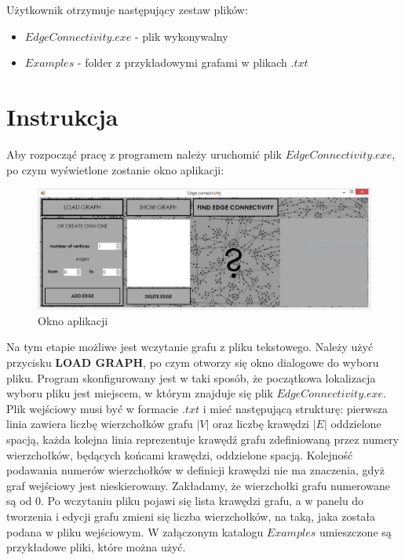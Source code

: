 \documentclass{article}
\begin{document}
Użytkownik otrzymuje następujący zestaw plików:

\begin{itemize}
    \item $EdgeConnectivity.exe$ - plik wykonywalny
    \item $Examples$ - folder z przykładowymi grafami w plikach $.txt$
\end{itemize}



\section{Instrukcja}

Aby rozpocząć pracę z programem należy uruchomić plik $EdgeConnectivity.exe$, po czym wyświetlone zostanie okno aplikacji:
 
\begin{figure}[H]
\centering
\includegraphics[scale=0.4]{01}
\caption{Okno aplikacji}
\end{figure}


Na tym etapie możliwe jest wczytanie grafu z pliku tekstowego. Należy użyć przycisku \textbf{LOAD GRAPH}, po czym otworzy się okno dialogowe do wyboru pliku. Program skonfigurowany jest w taki sposób, że początkowa lokalizacja wyboru pliku jest miejscem, w którym znajduje się plik $EdgeConnectivity.exe$. Plik wejściowy musi być w formacie $.txt$ i mieć następującą strukturę:  pierwsza linia zawiera liczbę wierzchołków grafu $|V|$ oraz liczbę krawędzi $|E|$ oddzielone spacją, każda kolejna linia reprezentuje krawędź grafu zdeﬁniowaną przez numery wierzchołków, będących końcami krawędzi, oddzielone spacją. Kolejność podawania numerów wierzchołków w deﬁnicji krawędzi nie ma znaczenia, gdyż graf wejściowy jest nieskierowany. Zakładamy, że wierzchołki grafu numerowane są od 0.
Po wczytaniu pliku pojawi się lista krawędzi grafu, a w panelu do tworzenia i edycji grafu zmieni się liczba wierzchołków, na taką, jaka została podana w pliku wejściowym. W załączonym katalogu $Examples$ umieszczone są przykładowe pliki, które można użyć.
 
\end{document}
